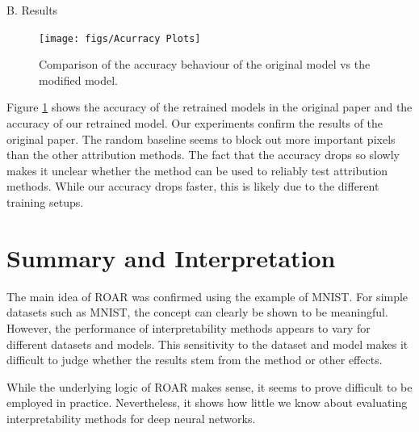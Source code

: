 B. Results

\begin{figure}[H]
	\centering
	\texttt{[image: figs/Acurracy Plots]}
	\caption {Comparison of the accuracy behaviour of the original model vs the modified model.}
	\label{fig:food101Res}
\end{figure}

Figure \ref{fig:food101Res} shows the accuracy of the retrained models in the original paper and the accuracy of our retrained model. Our experiments confirm the results of the original paper. The random baseline seems to block out more important pixels than the other attribution methods. The fact that the accuracy drops so slowly makes it unclear whether the method can be used to reliably test attribution methods. While our accuracy drops faster, this is likely due to the different training setups.

\section{Summary and Interpretation}

The main idea of ROAR was confirmed using the example of MNIST. For simple datasets such as MNIST, the concept can clearly be shown to be meaningful. However, the performance of interpretability methods appears to vary for different datasets and models. This sensitivity to the dataset and model makes it difficult to judge whether the results stem from the method or other effects.

While the underlying logic of ROAR makes sense, it seems to prove difficult to be employed in practice. Nevertheless, it shows how little we know about evaluating interpretability methods for deep neural networks.


